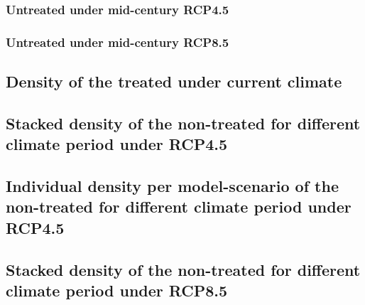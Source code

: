 \documentclass[12pt]{article}
\begin{document}
\subsubsection{Untreated under mid-century RCP4.5}








\subsubsection{Untreated under mid-century RCP8.5}








\subsection{Density of the treated under current climate}

\subsection{Stacked density of the non-treated for different climate period under RCP4.5}

\subsection{Individual density per model-scenario of the non-treated for different
  climate period under RCP4.5}

\subsection{Stacked density of the non-treated for different climate period under RCP8.5}

\end{document}
